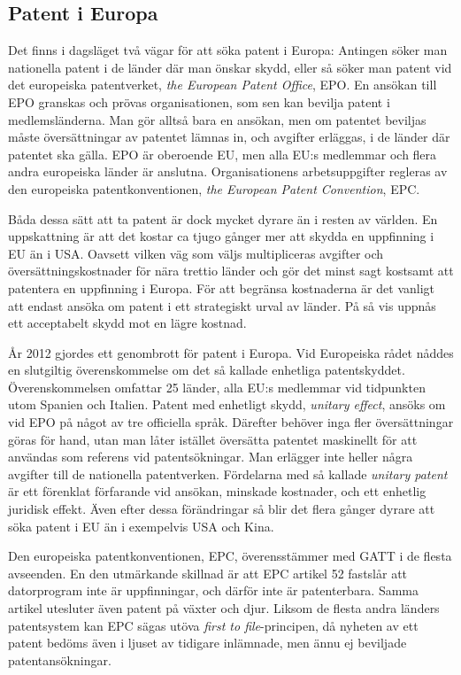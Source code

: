 \subsection{Patent i Europa}

Det finns i dagsläget två vägar för att söka patent i Europa:
Antingen söker man nationella patent i de länder där man önskar skydd, eller så söker man patent vid det europeiska patentverket, \emph{the European Patent Office}, EPO.
En ansökan till EPO granskas och prövas organisationen, som sen kan bevilja patent i medlemsländerna.
Man gör alltså bara en ansökan, men om patentet beviljas måste översättningar av patentet lämnas in, och avgifter erläggas, i de länder där patentet ska gälla.
EPO är oberoende EU, men alla EU:s medlemmar och flera andra europeiska länder är anslutna.
Organisationens arbetsuppgifter regleras av den europeiska patentkonventionen, \emph{the European Patent Convention}, EPC.

Båda dessa sätt att ta patent är dock mycket dyrare än i resten av världen.
En uppskattning är att det kostar ca tjugo gånger mer att skydda en uppfinning i EU än i USA.
Oavsett vilken väg som väljs multipliceras avgifter och översättningskostnader för nära trettio länder och gör det minst sagt kostsamt
att patentera en uppfinning i Europa.
För att begränsa kostnaderna är det vanligt att endast ansöka om patent i ett strategiskt urval av länder.
På så vis uppnås ett acceptabelt skydd mot en lägre kostnad.

År 2012 gjordes ett genombrott för patent i Europa.
Vid Europeiska rådet nåddes en slutgiltig överenskommelse om det så kallade enhetliga patentskyddet. 
Överenskommelsen omfattar 25 länder, alla EU:s medlemmar vid tidpunkten utom Spanien och Italien. 
Patent med enhetligt skydd, \emph{unitary effect}, ansöks om vid EPO på något av tre officiella språk.
Därefter behöver inga fler översättningar göras för hand, utan man låter istället översätta patentet maskinellt för att användas som referens vid patentsökningar.
Man erlägger inte heller några avgifter till de nationella patentverken.
Fördelarna med så kallade \emph{unitary patent} är ett förenklat förfarande vid ansökan, minskade kostnader, och ett enhetlig juridisk effekt.
Även efter dessa förändringar så blir det flera gånger dyrare att söka patent i EU än i exempelvis USA och Kina.

Den europeiska patentkonventionen, EPC, överensstämmer med GATT i de flesta avseenden.
En den utmärkande skillnad är att EPC artikel 52 fastslår att datorprogram inte är uppfinningar, och därför inte är patenterbara.
Samma artikel utesluter även patent på växter och djur.
Liksom de flesta andra länders patentsystem kan EPC sägas utöva \emph{first to file}-principen, då nyheten av ett patent bedöms även i ljuset av tidigare inlämnade, men ännu ej beviljade patentansökningar.


